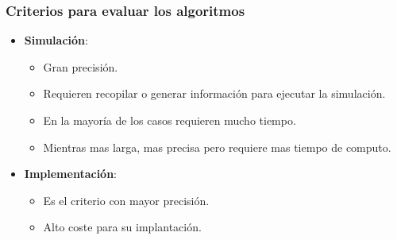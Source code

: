 \documentclass{beamer}
\begin{document}
\begin{frame}
	\frametitle{Criterios para evaluar los algoritmos}
	
	\begin{itemize}
		\item \textbf{Simulación}:
		\begin{itemize}
			\item Gran precisión.
			\item Requieren recopilar o generar información para ejecutar la simulación.
			\item En la mayoría de los casos requieren mucho tiempo.
			\item Mientras mas larga, mas precisa pero requiere mas tiempo de computo.
		\end{itemize}
		\vspace{0.5cm}
		
		\item \textbf{Implementación}:
		\begin{itemize}
			\item Es el criterio con mayor precisión.
			\item Alto coste para su implantación.
		\end{itemize}
	\end{itemize}
\end{frame}
\end{document}

